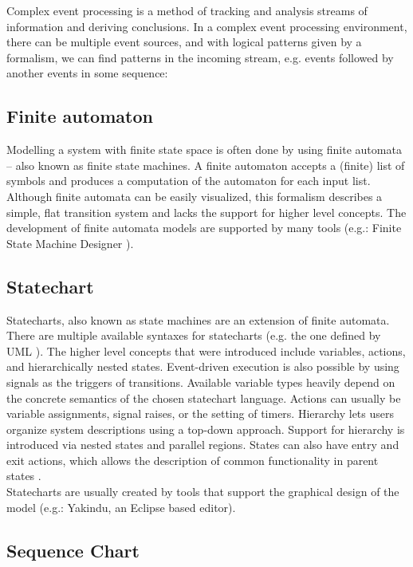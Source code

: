 Complex event processing is a method of tracking and analysis streams of information and deriving conclusions. In a complex event processing environment, there can be multiple event sources, and with logical patterns given by a formalism, we can find patterns in the incoming stream, e.g. events followed by another events in some sequence: \citep{epbas}

\subsection*{Finite automaton}

Modelling a system with finite state space is often done by using finite automata -- also known as finite state machines. A finite automaton accepts a (finite) list of symbols and produces a computation of the automaton for each input list.
Although finite automata can be easily visualized, this formalism describes a simple, flat transition system and lacks the support for higher level concepts. The development of finite automata models  are supported by many tools (e.g.: Finite State Machine Designer \citep{yakindu}).

\subsection*{Statechart}

Statecharts, also known as state machines are an extension of finite automata. There are multiple available syntaxes for statecharts (e.g. the one defined by UML \citep{stcuml}). The higher level concepts that were introduced include variables, actions, and hierarchically nested states. Event-driven execution is also possible by using signals as the triggers of transitions. Available variable types heavily depend on the concrete semantics of the chosen statechart language. Actions can usually be variable assignments, signal raises, or the setting of timers. Hierarchy lets users organize system descriptions using a top-down approach. Support for hierarchy is introduced via nested states and parallel regions. States can also have entry and exit actions, which allows the description of common functionality in parent states \citep{stcmove}.\\
Statecharts are usually created by tools that support the graphical design of the model (e.g.: Yakindu, an Eclipse based editor).


\subsection*{Sequence Chart}

